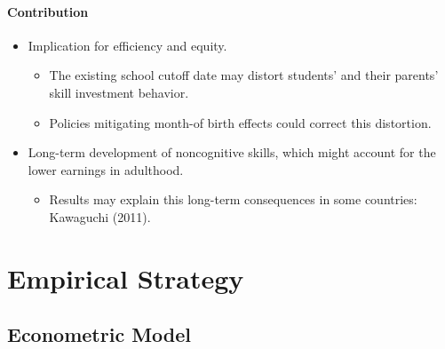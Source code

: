 \documentclass[../root]{subfiles}
\begin{document}
    \paragraph{Contribution}

    \begin{itemize}
      \item Implication for efficiency and equity.
      \begin{itemize}
        \item The existing school cutoff date may distort students' and their parents' skill investment behavior.
        \item Policies mitigating month-of birth effects could correct this distortion.
      \end{itemize}
      \item Long-term development of noncognitive skills, which might account for the lower earnings in adulthood.
      \begin{itemize}
        \item Results may explain this long-term consequences in some countries: Kawaguchi (2011).
      \end{itemize}
    \end{itemize}

    \section{Empirical Strategy}
    \subsection{Econometric Model}
\end{document}
